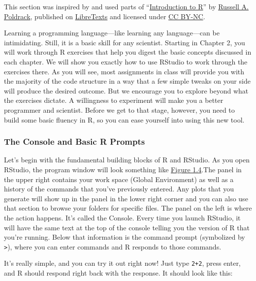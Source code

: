 \documentclass[
]{book}
\begin{document}
This section was inspired by and used parts of ``\href{https://chem.libretexts.org/@go/page/7641}{Introduction to R}'' by \href{https://poldracklab.stanford.edu/}{Russell A. Poldrack}, published on \href{https://libretexts.org/}{LibreTexts} and licensed under \href{https://creativecommons.org/licenses/by-nc/4.0/}{CC BY-NC}.

Learning a programming language---like learning any language---can be intimidating. Still, it is a basic skill for any scientist. Starting in Chapter 2, you will work through R exercises that help you digest the basic concepts discussed in each chapter. We will show you exactly how to use RStudio to work through the exercises there. As you will see, most assignments in class will provide you with the majority of the code structure in a way that a few simple tweaks on your side will produce the desired outcome. But we encourage you to explore beyond what the exercises dictate. A willingness to experiment will make you a better programmer and scientist. Before we get to that stage, however, you need to build some basic fluency in R, so you can ease yourself into using this new tool.

\hypertarget{the-console-and-basic-r-prompts}{%
\subsubsection*{The Console and Basic R Prompts}\label{the-console-and-basic-r-prompts}}

Let's begin with the fundamental building blocks of R and RStudio. As you open RStudio, the program window will look something like \protect\hyperlink{Fig1.4}{Figure 1.4}.The panel in the upper right contains your work space (Global Environment) as well as a history of the commands that you've previously entered. Any plots that you generate will show up in the panel in the lower right corner and you can also use that section to browse your folders for specific files. The panel on the left is where the action happens. It's called the Console. Every time you launch RStudio, it will have the same text at the top of the console telling you the version of R that you're running. Below that information is the command prompt (symbolized by \texttt{\textgreater{}}), where you can enter commands and R responds to those commands.

It's really simple, and you can try it out right now! Just type \texttt{2+2}, press enter, and R should respond right back with the response. It should look like this:
\end{document}
